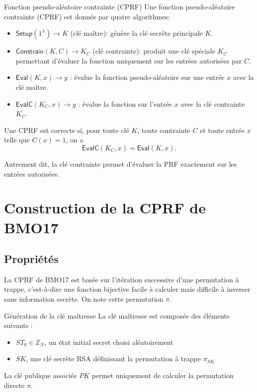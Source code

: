 \documentclass[9pt]{extarticle}
\begin{document}
\begin{defbox}{Fonction pseudo-aléatoire contrainte (CPRF)}
Une fonction pseudo-aléatoire contrainte (CPRF) est donnée par quatre algorithmes:
\begin{itemize}
\item $\textsf{Setup}(1^\lambda) \to K$ (clé maître): génère la clé secrète principale $K$.
\item $\textsf{Constrain}(K,C) \to K_C$ (clé contrainte): produit une clé spéciale $K_C$ permettant
d’évaluer la fonction uniquement sur les entrées autorisées par $C$.
\item $\textsf{Eval}(K,x) \to y$ : évalue la fonction pseudo-aléatoire sur une entrée $x$ avec la clé maître.
\item $\textsf{EvalC}(K_C,x) \to y$ : évalue la fonction sur l’entrée $x$ avec la clé contrainte $K_C$.
\end{itemize}

Une CPRF est correcte si, pour toute clé $K$, toute contrainte $C$ et toute entrée $x$
telle que $C(x)=1$, on a
\[
\textsf{EvalC}(K_C,x)=\textsf{Eval}(K,x).
\]

Autrement dit, la clé contrainte permet d’évaluer la PRF exactement sur les entrées autorisées.
\end{defbox}

\section{Construction de la CPRF de BMO17}

\subsection{Propriétés}

La CPRF de BMO17 est basée sur l'itération successive d'une permutation à trappe,
c’est-à-dire une fonction bijective facile à calculer mais difficile à inverser sans information secrète.
On note cette permutation $\pi$.

\begin{defbox}{Génération de la clé maîtresse}
La clé maîtresse est composée des éléments suivants :
\begin{itemize}
  \item $ST_0 \in \mathbb{Z}_N$, un état initial secret choisi aléatoirement
  \item $SK$, une clé secrète RSA définissant la permutation à trappe $\pi_{SK}$
\end{itemize}
La clé publique associée $PK$ permet uniquement de calculer la permutation directe $\pi$.
\end{defbox}
\end{document}
